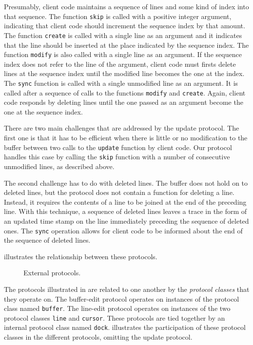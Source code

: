 Presumably, client code maintains a sequence of lines and some kind of
index into that sequence.  The function \texttt{skip} is called with a
positive integer argument, indicating that client code should
increment the sequence index by that amount.  The function
\texttt{create} is called with a single line as an argument and it
indicates that the line should be inserted at the place indicated by
the sequence index.  The function \texttt{modify} is also called with
a single line as an argument.  If the sequence index does not refer to
the line of the argument, client code must firsts delete lines at the
sequence index until the modified line becomes the one at the index.
The \texttt{sync} function is called with a single unmodified line as
an argument.  It is called after a sequence of calls to the functions
\texttt{modify} and \texttt{create}.  Again, client code responds by
deleting lines until the one passed as an argument become the one at
the sequence index.

There are two main challenges that are addressed by the update
protocol.  The first one is that it has to be efficient when there is
little or no modification to the buffer between two calls to the
\texttt{update} function by client code.  Our protocol handles this
case by calling the \texttt{skip} function with a number of
consecutive unmodified lines, as described above.

The second challenge has to do with deleted lines.  The buffer does
not hold on to deleted lines, but the protocol does not contain a
function for deleting a line.  Instead, it requires the contents of a
line to be joined at the end of the preceding line.  With this
technique, a sequence of deleted lines leaves a trace in the form of
an updated time stamp on the line immediately preceding the sequence
of deleted ones.  The \texttt{sync} operation allows for client code
to be informed about the end of the sequence of deleted lines.

 illustrates the relationship between
these protocols.

\begin{figure}
\begin{center}
\end{center}
\caption{\label{fig-external-protocols}
External protocols.}
\end{figure}

The protocols illustrated in  are
related to one another by the \emph{protocol classes} that they
operate on.  The buffer-edit protocol operates on instances of the
protocol class named \texttt{buffer}.  The line-edit protocol operates
on instances of the two protocol classes \texttt{line} and
\texttt{cursor}.  These protocols are tied together by an internal
protocol class named \texttt{dock}.  
illustrates the participation of these protocol classes in the
different protocols, omitting the update protocol.

